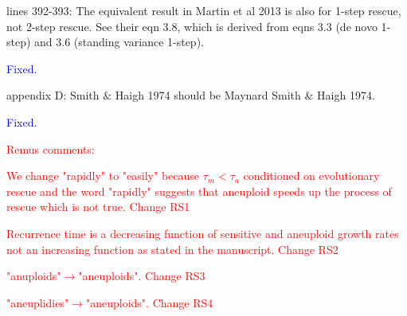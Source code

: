 \documentclass[12pt]{extarticle}
\begin{document}
lines 392-393: The equivalent result in Martin et al 2013 is also for 1-step rescue, not 2-step rescue. See their eqn 3.8, which is derived from eqns 3.3 (de novo 1-step) and 3.6 (standing variance 1-step).

\textcolor{blue}{Fixed.}

appendix D: Smith $\&$ Haigh 1974 should be Maynard Smith $\&$ Haigh 1974.

\textcolor{blue}{Fixed.}

\textcolor{red}{Remus comments:}

\textcolor{red}{We change "rapidly" to "easily" because $\tau_m<\tau_a$ conditioned on evolutionary rescue and the word "rapidly" suggests that aneuploid speeds up the process of rescue which is not true. Change RS1}

\textcolor{red}{Recurrence time is a decreasing function of sensitive and aneuploid growth rates not an increasing function as stated in the manuscript. Change RS2}

\textcolor{red}{"anuploids"$\rightarrow$"aneuploids". Change RS3}

\textcolor{red}{"aneuplidies"$\rightarrow$"aneuploids". Change RS4}








\end{document}
